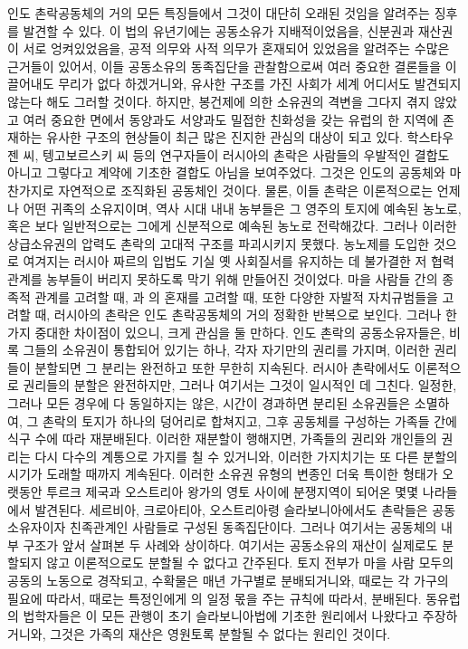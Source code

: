 인도 촌락공동체의 거의 모든 특징들에서
그것이 대단히 오래된 것임을 알려주는 징후를 발견할 수 있다.
이 법의 유년기에는 공동소유가 지배적이었음을,
신분권과 재산권이 서로 엉켜있었음을,
공적 의무와 사적 의무가 혼재되어 있었음을 알려주는
수많은 근거들이 있어서,
이들 공동소유의 동족집단을 관찰함으로써 여러 중요한 결론들을
이끌어내도 무리가 없다 하겠거니와,
유사한 구조를 가진 사회가 세계 어디서도 발견되지 않는다 해도 그러할 것이다.
하지만,
봉건제에 의한 소유권의 격변을 그다지 겪지 않았고
여러 중요한 면에서 동양과도 서양과도 밀접한 친화성을 갖는
유럽의 한 지역에 존재하는 유사한 구조의 현상들이
최근 많은 진지한 관심의 대상이 되고 있다.
학스타우젠 씨,
텡고보르스키 씨 등의 연구자들이
러시아의 촌락은 사람들의 우발적인 결합도 아니고
그렇다고 계약에 기초한 결합도 아님을 보여주었다.
그것은 인도의 공동체와 마찬가지로 자연적으로 조직화된 공동체인 것이다.
물론,
이들 촌락은 이론적으로는 언제나 어떤 귀족의 소유지이며,
역사 시대 내내
농부들은
그 영주의 토지에 예속된 농노로,
혹은 보다 일반적으로는
그에게 신분적으로 예속된 농노로 전락해갔다.
그러나
이러한 상급소유권의 압력도
촌락의 고대적 구조를 파괴시키지 못했다.
농노제를 도입한 것으로 여겨지는 러시아 짜르의 입법도
기실 옛 사회질서를 유지하는 데 불가결한 저 협력관계를
농부들이 버리지 못하도록 막기 위해 만들어진 것이었다.
마을 사람들 간의 종족적 관계를 고려할 때,
과 의 혼재를 고려할 때,
또한 다양한 자발적 자치규범들을 고려할 때,
러시아의 촌락은 인도 촌락공동체의 거의 정확한 반복으로 보인다.
그러나 한 가지 중대한 차이점이 있으니,
크게 관심을 둘 만하다.
인도 촌락의 공동소유자들은,
비록 그들의 소유권이 통합되어 있기는 하나,
각자 자기만의 권리를 가지며,
이러한 권리들이 분할되면 그 분리는 완전하고 또한 무한히 지속된다.
러시아 촌락에서도 이론적으로 권리들의 분할은 완전하지만,
그러나 여기서는 그것이 일시적인 데 그친다.
일정한, 그러나 모든 경우에 다 동일하지는 않은,
시간이 경과하면
분리된 소유권들은 소멸하여,
그 촌락의 토지가 하나의 덩어리로 합쳐지고, 그후
공동체를 구성하는 가족들 간에 식구 수에 따라 재분배된다.
이러한 재분할이 행해지면,
가족들의 권리와 개인들의 권리는 다시
다수의 계통으로 가지를 칠 수 있거니와,
이러한 가지치기는 또 다른 분할의 시기가 도래할 때까지 계속된다.
이러한 소유권 유형의 변종인 더욱 특이한 형태가
오랫동안
투르크 제국과 오스트리아 왕가의 영토 사이에 분쟁지역이 되어온
몇몇 나라들에서 발견된다.
세르비아, 크로아티아, 오스트리아령 슬라보니아에서도
촌락들은 공동소유자이자 친족관계인 사람들로 구성된 동족집단이다.
그러나 여기서는 공동체의 내부 구조가
앞서 살펴본 두 사례와 상이하다.
여기서는 공동소유의 재산이 실제로도 분할되지 않고
이론적으로도 분할될 수 없다고 간주된다.
토지 전부가 마을 사람 모두의 공동의 노동으로 경작되고,
수확물은 매년 가구별로 분배되거니와,
때로는 각 가구의 필요에 따라서,
때로는 특정인에게 의 일정 몫을 주는 규칙에 따라서,
분배된다.
동유럽의 법학자들은 이 모든 관행이
초기 슬라보니아법에 기초한 원리에서 나왔다고 주장하거니와,
그것은 가족의 재산은 영원토록 분할될 수 없다는 원리인 것이다.


